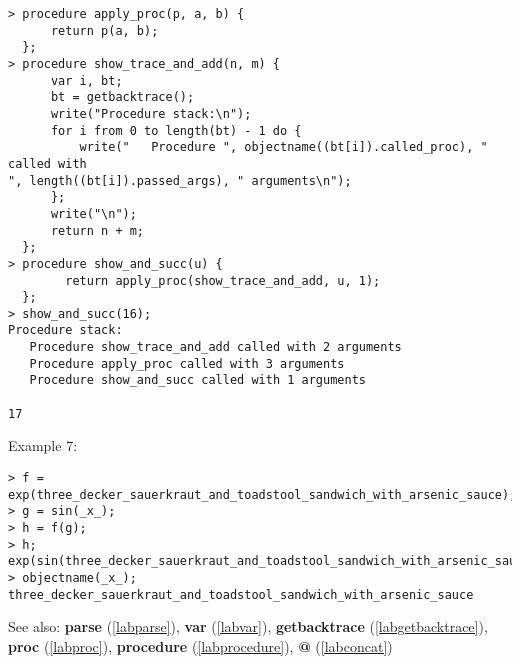 \begin{center}\begin{minipage}{15cm}\begin{Verbatim}[frame=single]
> procedure apply_proc(p, a, b) {
      return p(a, b);
  };
> procedure show_trace_and_add(n, m) {
      var i, bt;
      bt = getbacktrace();
      write("Procedure stack:\n");
      for i from 0 to length(bt) - 1 do {
          write("   Procedure ", objectname((bt[i]).called_proc), " called with 
", length((bt[i]).passed_args), " arguments\n");
      };
      write("\n");      
      return n + m;
  };
> procedure show_and_succ(u) {
        return apply_proc(show_trace_and_add, u, 1);
  };
> show_and_succ(16);
Procedure stack:
   Procedure show_trace_and_add called with 2 arguments
   Procedure apply_proc called with 3 arguments
   Procedure show_and_succ called with 1 arguments

17
\end{Verbatim}
\end{minipage}\end{center}
\noindent Example 7: 
\begin{center}\begin{minipage}{15cm}\begin{Verbatim}[frame=single]
> f = exp(three_decker_sauerkraut_and_toadstool_sandwich_with_arsenic_sauce);
> g = sin(_x_);
> h = f(g);
> h;
exp(sin(three_decker_sauerkraut_and_toadstool_sandwich_with_arsenic_sauce))
> objectname(_x_);
three_decker_sauerkraut_and_toadstool_sandwich_with_arsenic_sauce
\end{Verbatim}
\end{minipage}\end{center}
See also: \textbf{parse} (\ref{labparse}), \textbf{var} (\ref{labvar}), \textbf{getbacktrace} (\ref{labgetbacktrace}), \textbf{proc} (\ref{labproc}), \textbf{procedure} (\ref{labprocedure}), \textbf{@} (\ref{labconcat})
